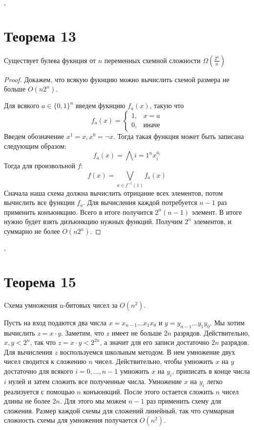 \documentclass[a4paper,12pt]{article}
\begin{document}
    \sep
    \section {Теорема 13}
    \begin{theorem}
        Существует булева фукнция от $n$ переменных схемной сложности $\Omega(\frac{2^n}{n})$
    \end{theorem}
    \begin{proof}
        Докажем, что всякую фукнцию можно вычислить схемой размера не больше $O(n2^n)$.
        
        Для всякого $a \in \{0, 1\}^n$ введем фукнцию $f_a(x)$, такую что
        \[
        f_a(x) = 
        \begin{cases}
        1, & x = a \\
        0, &\text{иначе}
        \end{cases}
        \]
        Введем обозначение $x^1 = x, x^0 = \lnot x$. Тогда такая функция может быть записана следующим образом:
        \[
        f_a(x) = \bigwedge{i = 1}^n x_i^{a_i}
        \]
        Тогда для произвольной $f$:
        \[
        f(x) = \bigvee_{a \in f^{-1}(1)} f_a(x)
        \]
        Сначала наша схема должна вычислить отрицание всех элементов, потом вычислить все функции $f_a$. Для вычисления каждой потребуется $n - 1$ раз применить конъюнкцию. Всего в итоге получится $2^n(n - 1)$ элемент. В итоге нужно будет взять дизъюнкцию нужных функций. Получим $2^n$ элементов, и суммарно не более $O(n2^n)$. 
        
    \end{proof}
    \sep
    \section{Теорема 15}
    Cхема умножения n-битовых чисел за $O(n^2)$.
    
    Пусть на вход подаются два числа $x=x_{n-1}\ldots x_1x_0$ и
    $y=y_{n-1}\ldots y_1y_0$. Мы хотим вычислить $z = x \cdot y$. Заметим, что
    $z$ имеет не больше $2n$ разрядов. Действительно, $x, y < 2^n$, так что
    $z = x \cdot y < 2^{2n}$, а значит для его записи достаточно $2n$ разрядов.\\
    
    Для вычисления $z$ воспользуемся школьным методом. В нем умножение двух чисел
    сводится к сложению $n$ чисел. Действительно, чтобы умножить $x$ на $y$ достаточно
    для всякого $i = 0, \ldots , n - 1$ умножить $x$ на $y_i$, приписать в конце числа
    $i$ нулей и затем сложить все полученные числа. Умножение $x$ на $y_i$ легко
    реализуется с помощью $n$ конъюнкций. После этого остается сложить $n$ чисел
    длины не более $2n$. Для этого мы можем $n-1$ раз применить схему для сложения.
    Размер каждой схемы для сложений линейный, так что суммарная сложность схемы для
    умножения получается $O(n^2)$.
    
\end{document}

